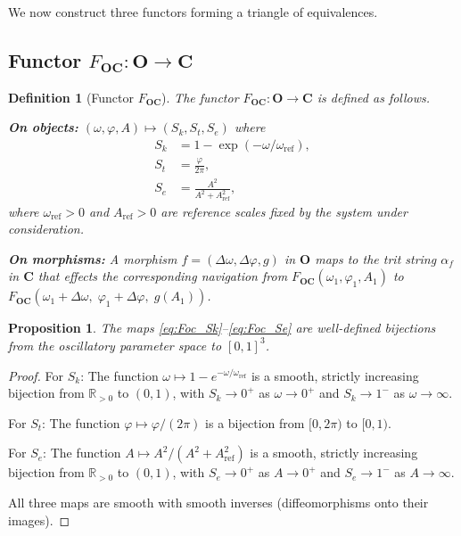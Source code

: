 \documentclass[twocolumn,10pt]{article}
\newtheorem{proposition}[theorem]{Proposition}
\newtheorem{definition}[theorem]{Definition}
\theoremstyle{remark}
\newcommand{\Sk}{S_k}
\newcommand{\St}{S_t}
\newcommand{\Se}{S_e}
\newcommand{\CatO}{\mathbf{O}}
\newcommand{\CatC}{\mathbf{C}}
\newcommand{\CatB}{\mathbf{B}}
\newcommand{\Foc}{F_{\CatO\CatC}}
\newcommand{\Fcb}{F_{\CatC\CatB}}
\newcommand{\Fbo}{F_{\CatB\CatO}}
\begin{document}
We now construct three functors forming a triangle of equivalences.

\begin{center}
\end{center}

\subsection{Functor $\Foc: \CatO \to \CatC$}

\begin{definition}[Functor $\Foc$]
\label{def:Foc}
The functor $\Foc: \CatO \to \CatC$ is defined as follows.

\textbf{On objects:} $(\omega, \varphi, A) \mapsto (\Sk, \St, \Se)$ where
\begin{align}
\Sk &= 1 - \exp(-\omega/\omega_{\mathrm{ref}}), \label{eq:Foc_Sk}\\
\St &= \frac{\varphi}{2\pi}, \label{eq:Foc_St}\\
\Se &= \frac{A^2}{A^2 + A_{\mathrm{ref}}^2}, \label{eq:Foc_Se}
\end{align}
where $\omega_{\mathrm{ref}} > 0$ and $A_{\mathrm{ref}} > 0$ are reference scales fixed by the system under consideration.

\textbf{On morphisms:} A morphism $f = (\Delta\omega, \Delta\varphi, g)$ in $\CatO$ maps to the trit string $\alpha_f$ in $\CatC$ that effects the corresponding navigation from $\Foc(\omega_1,\varphi_1,A_1)$ to $\Foc(\omega_1+\Delta\omega,\; \varphi_1+\Delta\varphi,\; g(A_1))$.
\end{definition}

\begin{proposition}
\label{prop:Foc_welldef}
The maps \eqref{eq:Foc_Sk}--\eqref{eq:Foc_Se} are well-defined bijections from the oscillatory parameter space to $[0,1]^3$.
\end{proposition}

\begin{proof}
For $\Sk$: The function $\omega \mapsto 1 - e^{-\omega/\omega_{\mathrm{ref}}}$ is a smooth, strictly increasing bijection from $\mathbb{R}_{>0}$ to $(0,1)$, with $\Sk \to 0^+$ as $\omega \to 0^+$ and $\Sk \to 1^-$ as $\omega \to \infty$.

For $\St$: The function $\varphi \mapsto \varphi/(2\pi)$ is a bijection from $[0,2\pi)$ to $[0,1)$.

For $\Se$: The function $A \mapsto A^2/(A^2+A_{\mathrm{ref}}^2)$ is a smooth, strictly increasing bijection from $\mathbb{R}_{>0}$ to $(0,1)$, with $\Se \to 0^+$ as $A \to 0^+$ and $\Se \to 1^-$ as $A \to \infty$.

All three maps are smooth with smooth inverses (diffeomorphisms onto their images).
\end{proof}
\end{document}
